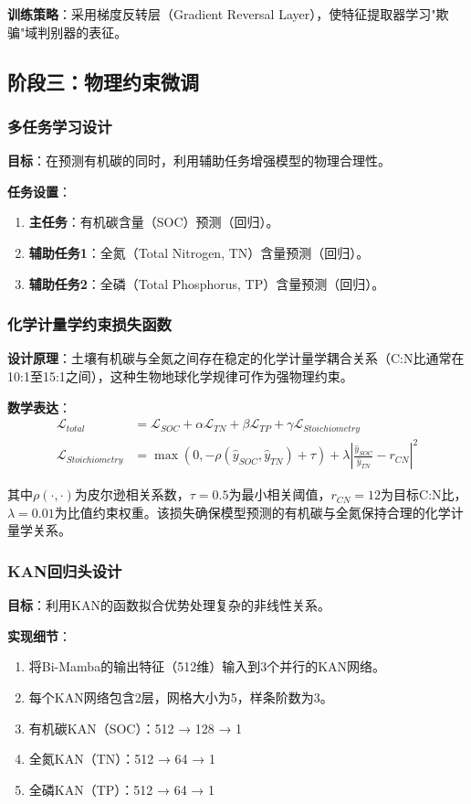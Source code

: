 \documentclass[12pt, a4paper]{article}
\begin{document}
\textbf{训练策略}：采用梯度反转层（Gradient Reversal Layer），使特征提取器学习"欺骗"域判别器的表征。

\subsection{阶段三：物理约束微调}

\subsubsection{多任务学习设计}
\textbf{目标}：在预测有机碳的同时，利用辅助任务增强模型的物理合理性。

\textbf{任务设置}：
\begin{enumerate}
    \item \textbf{主任务}：有机碳含量（SOC）预测（回归）。
    \item \textbf{辅助任务1}：全氮（Total Nitrogen, TN）含量预测（回归）。
    \item \textbf{辅助任务2}：全磷（Total Phosphorus, TP）含量预测（回归）。
\end{enumerate}

\subsubsection{化学计量学约束损失函数}
\textbf{设计原理}：土壤有机碳与全氮之间存在稳定的化学计量学耦合关系（C:N比通常在10:1至15:1之间），这种生物地球化学规律可作为强物理约束。

\textbf{数学表达}：
\begin{align}
\mathcal{L}_{total} &= \mathcal{L}_{SOC} + \alpha \mathcal{L}_{TN} + \beta \mathcal{L}_{TP} + \gamma \mathcal{L}_{Stoichiometry} \\
\mathcal{L}_{Stoichiometry} &= \max(0, -\rho(\hat{y}_{SOC}, \hat{y}_{TN}) + \tau) + \lambda |\frac{\hat{y}_{SOC}}{\hat{y}_{TN}} - r_{CN}|^2
\end{align}

其中$\rho(\cdot, \cdot)$为皮尔逊相关系数，$\tau=0.5$为最小相关阈值，$r_{CN}=12$为目标C:N比，$\lambda=0.01$为比值约束权重。该损失确保模型预测的有机碳与全氮保持合理的化学计量学关系。

\subsubsection{KAN回归头设计}
\textbf{目标}：利用KAN的函数拟合优势处理复杂的非线性关系。

\textbf{实现细节}：
\begin{enumerate}
    \item 将Bi-Mamba的输出特征（512维）输入到3个并行的KAN网络。
    \item 每个KAN网络包含2层，网格大小为5，样条阶数为3。
    \item 有机碳KAN（SOC）：512 → 128 → 1
    \item 全氮KAN（TN）：512 → 64 → 1  
    \item 全磷KAN（TP）：512 → 64 → 1
\end{enumerate}
\end{document}
